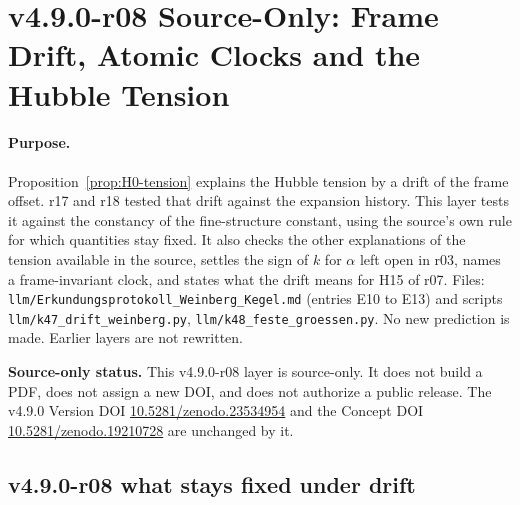 \clearpage
\section*{v4.9.0-r08 Source-Only: Frame Drift, Atomic Clocks and the Hubble Tension}
\label{sec:v490-r08-drift-clocks-hubble}

\paragraph{Purpose.}
Proposition~\ref{prop:H0-tension} explains the Hubble tension by a drift of the frame offset.  r17 and r18 tested that
drift against the expansion history.  This layer tests it against the constancy of the fine-structure constant, using
the source's own rule for which quantities stay fixed.  It also checks the other explanations of the tension available
in the source, settles the sign of \(k\) for \(\alpha\) left open in r03, names a frame-invariant clock, and states what
the drift means for H15 of r07.  Files: \texttt{llm/Erkundungsprotokoll\_Weinberg\_Kegel.md} (entries E10 to E13) and
scripts \texttt{llm/k47\_drift\_weinberg.py}, \texttt{llm/k48\_feste\_groessen.py}.  No new prediction is made.  Earlier
layers are not rewritten.

\noindent\textbf{Source-only status.}
This v4.9.0-r08 layer is source-only.  It does not build a PDF, does not assign a new DOI,
and does not authorize a public release.  The v4.9.0 Version DOI
\href{https://doi.org/10.5281/zenodo.23534954}{10.5281/zenodo.23534954} and the Concept DOI
\href{https://doi.org/10.5281/zenodo.19210728}{10.5281/zenodo.19210728} are unchanged by it.

\subsection*{v4.9.0-r08 what stays fixed under drift}
\label{subsec:v490-r08-fixed}

